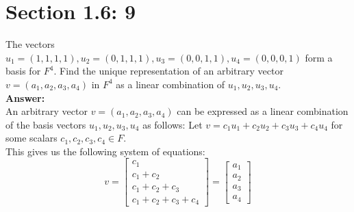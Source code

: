 \documentclass{article}
\begin{document}
\section*{Section 1.6: 9}
The vectors $u_1 = (1,1,1,1), u_2 = (0,1,1,1), u_3 = (0,0,1,1), u_4 = (0,0,0,1)$ form a basis for $F^4$. Find the unique representation of an arbitrary vector $v = (a_1,a_2,a_3,a_4)$ in $F^4$ as a linear combination of $u_1 , u_2 , u_3 , u_4$.\\
\textbf{Answer:}\\
An arbitrary vector $v = (a_1,a_2,a_3,a_4)$ can be expressed as a linear combination of the basis vectors $u_1, u_2, u_3, u_4$ as follows:
Let $v = c_1 u_1 + c_2 u_2 + c_3 u_3 + c_4 u_4$ for some scalars $c_1, c_2, c_3, c_4 \in F$.\\
This gives us the following system of equations:
$$ v = \begin{bmatrix}
    c_1 \\
    c_1 + c_2 \\
    c_1 + c_2 + c_3 \\
    c_1 + c_2 + c_3 + c_4
\end{bmatrix} = \begin{bmatrix}
    a_1 \\
    a_2 \\
    a_3 \\
    a_4
\end{bmatrix}
$$
\end{document}
